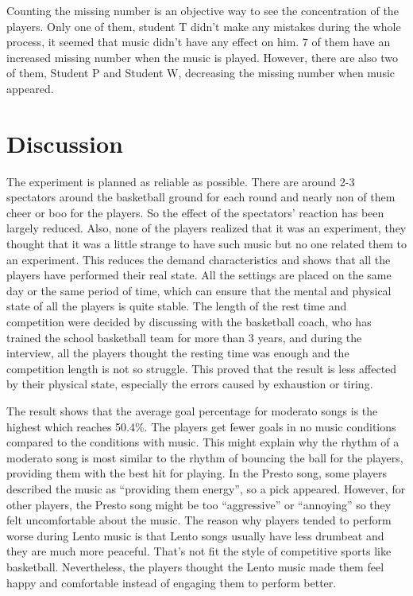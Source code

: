 \documentclass[man,floatsintext]{apa7}
\begin{document}
Counting the missing number is an objective way to see the concentration of the players. Only one of them, student T didn't make any mistakes during the whole process, it seemed that music didn't have any effect on him. 7 of them have an increased missing number when the music is played. However, there are also two of them, Student P and Student W, decreasing the missing number when music appeared. 

\section{Discussion}

The experiment is planned as reliable as possible. There are around 2-3 spectators around the basketball ground for each round and nearly non of them cheer or boo for the players. So the effect of the spectators' reaction has been largely reduced. Also, none of the players realized that it was an experiment, they thought that it was a little strange to have such music but no one related them to an experiment. This reduces the demand characteristics and shows that all the players have performed their real state. All the settings are placed on the same day or the same period of time, which can ensure that the mental and physical state of all the players is quite stable. The length of the rest time and competition were decided by discussing with the basketball coach, who has trained the school basketball team for more than 3 years, and during the interview, all the players thought the resting time was enough and the competition length is not so struggle. This proved that the result is less affected by their physical state, especially the errors caused by exhaustion or tiring. 

The result shows that the average goal percentage for moderato songs is the highest which reaches 50.4\%. The players get fewer goals in no music conditions compared to the conditions with music. This might explain why the rhythm of a moderato song is most similar to the rhythm of bouncing the ball for the players, providing them with the best hit for playing. In the Presto song, some players described the music as ``providing them energy'', so a pick appeared. However, for other players, the Presto song might be too ``aggressive'' or ``annoying'' so they felt uncomfortable about the music. The reason why players tended to perform worse during Lento music is that Lento songs usually have less drumbeat and they are much more peaceful. That's not fit the style of competitive sports like basketball. Nevertheless, the players thought the Lento music made them feel happy and comfortable instead of engaging them to perform better.
\end{document}
